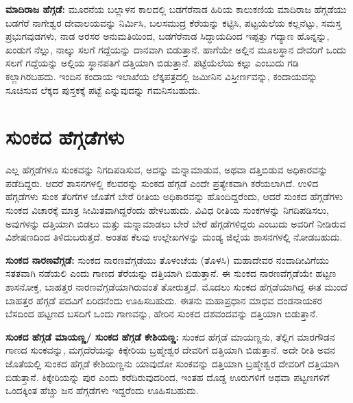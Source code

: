 \vskip -1pt

\textbf{ಮಾದಿರಾಜ ಹೆಗ್ಗಡೆ:} ಮೂರನೆಯ ಬಲ್ಲಾಳನ ಕಾಲದಲ್ಲಿ ಬಡಗೆರೆನಾಡ ಹಿರಿಯ ಕಾಲುಕಣಿಯ ಮಾದಿರಾಜ ಹೆಗ್ಗಡೆಯು ಬಡಗೆರೆ ನಾಗೇಶ್ವರ ದೇವಾಲಯವನ್ನು ನಿರ್ಮಿಸಿ, ಬಲಸಮುದ್ರ ಕೆರೆಯನ್ನು ಕಟ್ಟಿಸಿ, ಪಟ್ಟಯೆಲೆಯ ಕಲ್ಲನೆಟ್ಟು, ಸಮಸ್ತ ಪ್ರಭುಗವುಡಗಳು, ನಾಡ ಅರಸರ ಅನುಮತಿಯಿಂದ, ಬಡಗೆರೆನಾಡ ಸಿದ್ಧಾಯದಿಂದ ಇಪ್ಪತ್ತು ಗದ್ಯಾಣ ಹೊನ್ನನ್ನು, ಖಂಡುಗ ನೆಲ್ಲು, ನಾಲ್ಕು ಸಲಗೆ ಗದ್ದೆಯನ್ನು ದಾನವಾಗಿ ಬಿಡುತ್ತಾನೆ. ಹಾಗೆಯೇ ಅಲ್ಲಿನ ಮೂಲಸ್ಥಾನ ದೇವರಿಗೆ ಒಂದು ಸಲಗೆ ಗದ್ದೆಯನ್ನು ಅಲ್ಲಿಯ ಸ್ಥಾನಪತಿಗೆ ದತ್ತಿಯಾಗಿ ಬಿಡುತ್ತಾನೆ. ಪಟ್ಟೆಯೆಲೆಯ ಕಲ್ಲು ಎಂಬುದು ಗಡಿ ಕಲ್ಲಾಗಿರಬಹದು. ಇಂದಿನ ಕಂದಾಯ ಇಲಾಖೆಯ ಲೆಕ್ಕಪತ್ರದಲ್ಲಿ ಜಮೀನಿನ ವಿಸ್ತೀರ್ಣವನ್ನು, ಕಂದಾಯವನ್ನು ಸೂಚಿಸುವ ಲೆಕ್ಕದ ಪುಸ್ತಕಕ್ಕೆ ಪಟ್ಟೆ ಎನ್ನುವುದನ್ನು ಗಮನಿಸಬಹುದು.

\vskip -3pt

\section{ಸುಂಕದ ಹೆಗ್ಗಡೆಗಳು}

ಎಲ್ಲ ಹೆಗ್ಗಡೆಗಳೂ ಸುಂಕವನ್ನು ನಿಗದಿಪಡಿಸುವ, ಅದನ್ನು ಮನ್ನಾಮಾಡುವ, ಅಥವಾ ದತ್ತಿಬಿಡುವ ಅಧಿಕಾರವನ್ನು ಪಡೆದಿದ್ದರು. ಆದರೆ ಶಾಸನಗಳಲ್ಲಿ ಕೆಲವರನ್ನು ಸುಂಕದ ಹೆಗ್ಗಡೆ ಎಂದೇ ಪ್ರತ್ಯೇಕವಾಗಿ ಕರೆಯಲಾಗಿದೆ. ಉಳಿದ ಹೆಗ್ಗಡೆಗಳು ಸುಂಕ ತೆರಿಗೆಗಳ ಜೊತೆಗೆ ಬೇರೆ ರೀತಿಯ ಅಧಿಕಾರವನ್ನು ಹೊಂದಿದ್ದರೆಂದು, ಆದರೆ ಸುಂಕದ ಹೆಗ್ಗಡೆಗಳು ಸುಂಕದ ವಿಚಾರಕ್ಕೆ ಮಾತ್ರ ಸೀಮಿತವಾಗಿದ್ದರೆಂದು ಹೇಳಬಹುದು. ವಿವಿಧ ರೀತಿಯ ಸುಂಕಗಳನ್ನು ನಿಗದಿಪಡಿಸಲು, ಅವುಗಳನ್ನು ದತ್ತಿಯಾಗಿ ಬಿಡಲು ಮತ್ತು ಮನ್ನಾಮಾಡಲು ಬೇರೆ ಬೇರೆ ಹೆಗ್ಗಡೆಗಳಿದ್ದರು ಎಂಬುದು ಅವರಿಗೆ ನೀಡಿರುವ ವಿಶೇಷಣದಿಂದ ತಿಳಿದುಬರುತ್ತದೆ. ಅಂತಹ ಕೆಲವು ಉಲ್ಲೇಖಗಳನ್ನು ಮಂಡ್ಯ ಜಿಲ್ಲೆಯ ಶಾಸನಗಳಲ್ಲಿ ನೋಡಬಹುದು.

\vskip 2pt

\textbf{ಸುಂಕದ ನಾರಣವೆಗ್ಗಡೆ:} ಸುಂಕದ ನಾರಣವೆಗ್ಗಡೆಯು ತೊಳಂಚೆಯ (ತೊಳಸಿ) ಮಹಾದೇವರ ನಂದಾದೀವಿಗೆಯು ಸತತವಾಗಿ ನಡೆಯಲಿ ಎಂದು ಗಾಣದ ತೆರೆಯನ್ನು ದತ್ತಿಯಾಗಿ ಬಿಡುತ್ತಾನೆ. ಈ ಸುಂಕದ ನಾರಣವೆಗ್ಗಡೆಯೇ ಹಟ್ಟಣ ಶಾಸನೋಕ್ತ, ಬಾಹತ್ತರ ನಾರಣವೆಗ್ಗಡೆಯಾಗಿರುವಂತೆ ತೋರುತ್ತದೆ. ಮೊದಲು ಸುಂಕದ ಹೆಗ್ಗಡೆಯಾಗಿದ್ದ ಈತ ಮುಂದೆ ಬಾಹತ್ತರ ಹೆಗ್ಗಡೆ ಪದವಿಗೆ ಏರಿದನೆಂದು ಊಹಿಸಬಹುದು. ಈತನು ಮಹಾಪ್ರಧಾನ ಮಾಧವ ದಂಡನಾಯಕರ ಬೆಸದಿಂದ ಹಟ್ಟಣದ ಬಸದಿಗೆ ಒಂದು ಗಾಣವನ್ನು, ಹೇರಿನ ಸುಂಕದ ದಶವಂದವನ್ನು ದತ್ತಿಯಾಗಿ ಬಿಡುತ್ತಾನೆ.

\vskip -1pt

\textbf{ಸುಂಕದ ಹೆಗ್ಗಡೆ ಮಾಯಣ್ಣ/ ಸುಂಕದ ಹೆಗ್ಗಡೆ ಕೇಶಿಯಣ್ಣ:} ಸುಂಕದ ಹೆಗ್ಗಡೆ ಮಾಯಣ್ಣನು, ತೆಲ್ಲಿಗ ಮಾರಗೌಡನ ಗಾಣದ ಸುಂಕವನ್ನು, ಮಗ್ಗದೆರೆಯನ್ನು ಕಿಕ್ಕೇರಿಯ ಬ್ರಹ್ಮೇಶ್ವರ ದೇವರಿಗೆ ದತ್ತಿಯಾಗಿ ಬಿಡುತ್ತಾನೆ. ಅದೇ ರೀತಿ ಅವನ ಜೊತೆಯಲ್ಲಿ ಸುಂಕದ ಹೆಗ್ಗಡೆ ಕೇಶಿಯಣ್ಣನು ಯಾವುದೋ ಸುಂಕವನ್ನು ದತ್ತಿಯಾಗಿ ಬ್ರಹ್ಮೇಶ್ವರ ದೇವರಿಗೆ ದತ್ತಿಯಾಗಿ ಬಿಡುತ್ತಾನೆ. ಕಿಕ್ಕೇರಿಯನ್ನು ಪುರ ಎಂದು ಕರೆದಿರುವುದರಿಂದ, ಇಂತಹ ದೊಡ್ಡ ಊರುಗಳಿಗೆ ಅಥವಾ ಪಟ್ಟಣಗಳಿಗೆ ಒಂದಕ್ಕಿಂತ ಹೆಚ್ಚು ಜನ ಹೆಗ್ಗಡೆಗಳು ಇದ್ದರೆಂದು ಊಹಿಸಬಹುದು.

